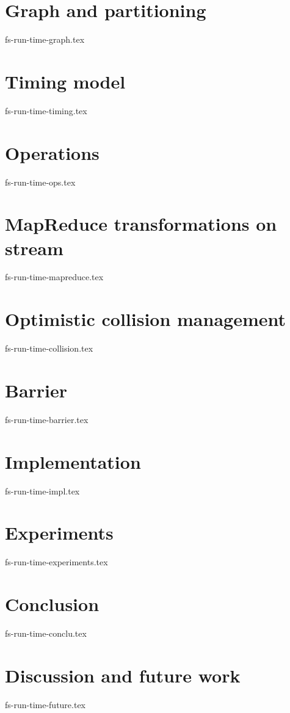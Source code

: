 \documentclass[sigconf]{acmart-edbt2018}
\theoremstyle{remark}
\begin{document}
\section {Graph and partitioning}
 {fs-run-time-graph.tex}

\section {Timing model}
 {fs-run-time-timing.tex}

\section {Operations}
 {fs-run-time-ops.tex}

\section {MapReduce transformations on stream}
 {fs-run-time-mapreduce.tex}

\section {Optimistic collision management}
 {fs-run-time-collision.tex}

\section {Barrier}
 {fs-run-time-barrier.tex}

\section {Implementation}
 {fs-run-time-impl.tex}

\section {Experiments}
 {fs-run-time-experiments.tex}

\section {Conclusion}
 {fs-run-time-conclu.tex}

\section {Discussion and future work}
 {fs-run-time-future.tex}



\end{document}

